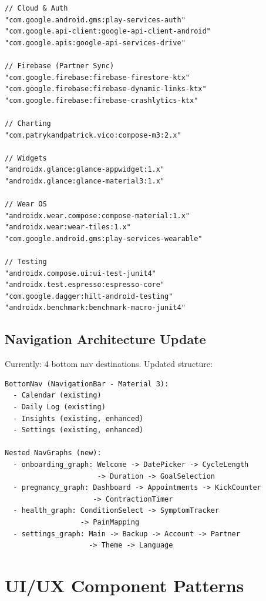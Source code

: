 \documentclass[12pt,a4paper]{article}
\begin{document}
\begin{lstlisting}[caption=New dependencies (build.gradle.kts)]
// Cloud & Auth
"com.google.android.gms:play-services-auth"
"com.google.api-client:google-api-client-android"
"com.google.apis:google-api-services-drive"

// Firebase (Partner Sync)
"com.google.firebase:firebase-firestore-ktx"
"com.google.firebase:firebase-dynamic-links-ktx"
"com.google.firebase:firebase-crashlytics-ktx"

// Charting
"com.patrykandpatrick.vico:compose-m3:2.x"

// Widgets
"androidx.glance:glance-appwidget:1.x"
"androidx.glance:glance-material3:1.x"

// Wear OS
"androidx.wear.compose:compose-material:1.x"
"androidx.wear:wear-tiles:1.x"
"com.google.android.gms:play-services-wearable"

// Testing
"androidx.compose.ui:ui-test-junit4"
"androidx.test.espresso:espresso-core"
"com.google.dagger:hilt-android-testing"
"androidx.benchmark:benchmark-macro-junit4"
\end{lstlisting}

\subsection{Navigation Architecture Update}

Currently: 4 bottom nav destinations. Updated structure:

\begin{lstlisting}
BottomNav (NavigationBar - Material 3):
  - Calendar (existing)
  - Daily Log (existing)
  - Insights (existing, enhanced)
  - Settings (existing, enhanced)

Nested NavGraphs (new):
  - onboarding_graph: Welcome -> DatePicker -> CycleLength
                      -> Duration -> GoalSelection
  - pregnancy_graph: Dashboard -> Appointments -> KickCounter
                     -> ContractionTimer
  - health_graph: ConditionSelect -> SymptomTracker
                  -> PainMapping
  - settings_graph: Main -> Backup -> Account -> Partner
                    -> Theme -> Language
\end{lstlisting}

\section{UI/UX Component Patterns}
\end{document}
